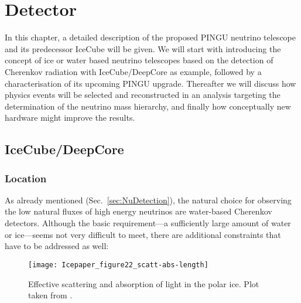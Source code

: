 \chapter{Detector}
\label{sec:det}

In this chapter, a detailed description of the proposed PINGU neutrino
telescope and its predecessor IceCube will be given. We will start with
introducing the concept of ice or water based neutrino telescopes based on the
detection of Cherenkov radiation with IceCube/DeepCore as example, followed by
a characterisation of its upcoming PINGU upgrade.
Thereafter we will discuss how physics events will be selected and
reconstructed in an analysis targeting the determination of the neutrino mass
hierarchy, and finally how conceptually new hardware might improve the results.

\section{IceCube/DeepCore}
\label{sec:ICDC}

\subsection{Location}
\label{sec:IClocation}

As already mentioned (Sec.~\ref{sec:NuDetection}), the natural choice for
observing the low natural fluxes of high energy neutrinos are water-based
Cherenkov detectors. Although the basic requirement---a sufficiently large
amount of water or ice---seems not very difficult to meet, there are additional
constraints that have to be addressed as well:

\begin{figure}[thp]
 \centering
 \texttt{[image: Icepaper\_figure22\_scatt-abs-length]}
 \caption{Effective scattering and absorption of light in the polar ice. Plot
  taken from \cite{IceProps}.}
 \label{fig:ice_scatt_abs}
\end{figure}

